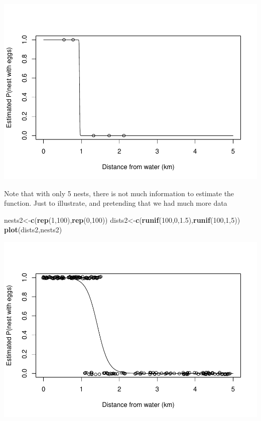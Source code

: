 \documentclass[
]{book}
\newenvironment{Shaded}{\begin{snugshade}}{\end{snugshade}}
\newcommand{\DecValTok}[1]{\textcolor[rgb]{0.00,0.00,0.81}{#1}}
\newcommand{\FloatTok}[1]{\textcolor[rgb]{0.00,0.00,0.81}{#1}}
\newcommand{\FunctionTok}[1]{\textcolor[rgb]{0.13,0.29,0.53}{\textbf{#1}}}
\newcommand{\NormalTok}[1]{#1}
\newcommand{\OtherTok}[1]{\textcolor[rgb]{0.56,0.35,0.01}{#1}}
\begin{document}
\includegraphics{ECOMODbook_files/figure-latex/ch13.36-1.pdf}

Note that with only 5 nests, there is not much information to estimate the function. Just to illustrate, and pretending that we had much more data

\begin{Shaded}
\begin{Highlighting}[]
\NormalTok{nests2}\OtherTok{\textless{}{-}}\FunctionTok{c}\NormalTok{(}\FunctionTok{rep}\NormalTok{(}\DecValTok{1}\NormalTok{,}\DecValTok{100}\NormalTok{),}\FunctionTok{rep}\NormalTok{(}\DecValTok{0}\NormalTok{,}\DecValTok{100}\NormalTok{))}
\NormalTok{dists2}\OtherTok{\textless{}{-}}\FunctionTok{c}\NormalTok{(}\FunctionTok{runif}\NormalTok{(}\DecValTok{100}\NormalTok{,}\DecValTok{0}\NormalTok{,}\FloatTok{1.5}\NormalTok{),}\FunctionTok{runif}\NormalTok{(}\DecValTok{100}\NormalTok{,}\DecValTok{1}\NormalTok{,}\DecValTok{5}\NormalTok{))}
\FunctionTok{plot}\NormalTok{(dists2,nests2)}
\end{Highlighting}
\end{Shaded}

\includegraphics{ECOMODbook_files/figure-latex/unnamed-chunk-27-1.pdf}
\end{document}
